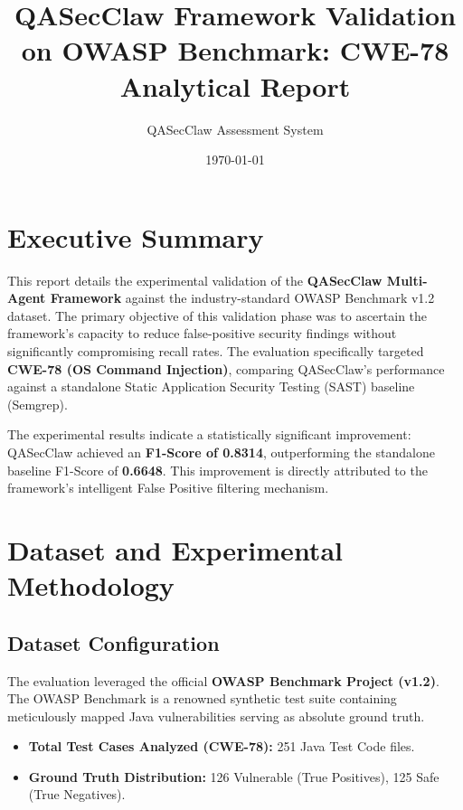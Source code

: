 \documentclass[11pt,a4paper]{article}
\title{\textbf{QASecClaw Framework Validation on OWASP Benchmark: CWE-78 Analytical Report}}
\author{QASecClaw Assessment System}
\date{\today}
\begin{document}
\maketitle

\section{Executive Summary}
This report details the experimental validation of the \textbf{QASecClaw Multi-Agent Framework} against the industry-standard OWASP Benchmark v1.2 dataset. The primary objective of this validation phase was to ascertain the framework's capacity to reduce false-positive security findings without significantly compromising recall rates. The evaluation specifically targeted \textbf{CWE-78 (OS Command Injection)}, comparing QASecClaw's performance against a standalone Static Application Security Testing (SAST) baseline (Semgrep). 

The experimental results indicate a statistically significant improvement: QASecClaw achieved an \textbf{F1-Score of 0.8314}, outperforming the standalone baseline F1-Score of \textbf{0.6648}. This improvement is directly attributed to the framework's intelligent False Positive filtering mechanism.

\section{Dataset and Experimental Methodology}

\subsection{Dataset Configuration}
The evaluation leveraged the official \textbf{OWASP Benchmark Project (v1.2)}. The OWASP Benchmark is a renowned synthetic test suite containing meticulously mapped Java vulnerabilities serving as absolute ground truth.
\begin{itemize}
    \item \textbf{Total Test Cases Analyzed (CWE-78):} 251 Java Test Code files.
    \item \textbf{Ground Truth Distribution:} 126 Vulnerable (True Positives), 125 Safe (True Negatives).
\end{itemize}
\end{document}
